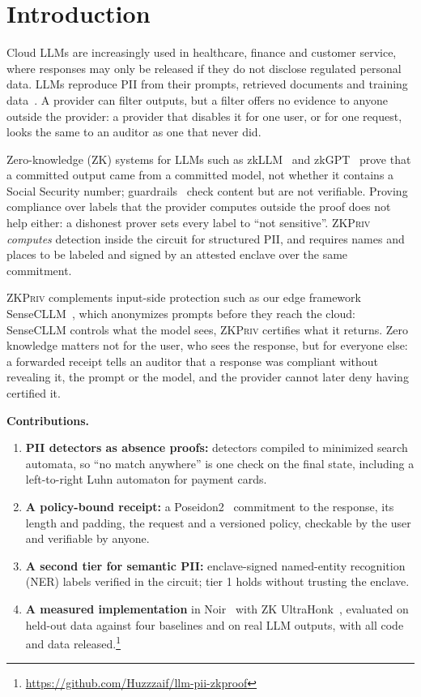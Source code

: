 \documentclass[conference]{IEEEtran}
\newcommand{\sys}{\textsc{ZKPriv}}
\begin{document}
\section{Introduction}

Cloud LLMs are increasingly used in healthcare, finance and customer service, where responses may only be released if they do not disclose regulated personal data. LLMs reproduce PII from their prompts, retrieved documents and training data~\cite{carlini2021extracting}. A provider can filter outputs, but a filter offers no evidence to anyone outside the provider: a provider that disables it for one user, or for one request, looks the same to an auditor as one that never did.

Zero-knowledge (ZK) systems for LLMs such as zkLLM~\cite{sun2024zkllm} and zkGPT~\cite{qu2025zkgpt} prove that a committed output came from a committed model, not whether it contains a Social Security number; guardrails~\cite{nemogauardrails,llamaguard2} check content but are not verifiable. Proving compliance over labels that the provider computes outside the proof does not help either: a dishonest prover sets every label to ``not sensitive''. \sys{} \emph{computes} detection inside the circuit for structured PII, and requires names and places to be labeled and signed by an attested enclave over the same commitment.

\sys{} complements input-side protection such as our edge framework SenseCLLM~\cite{sensecllm}, which anonymizes prompts before they reach the cloud: SenseCLLM controls what the model sees, \sys{} certifies what it returns. Zero knowledge matters not for the user, who sees the response, but for everyone else: a forwarded receipt tells an auditor that a response was compliant without revealing it, the prompt or the model, and the provider cannot later deny having certified it.

\textbf{Contributions.}
\begin{enumerate}[leftmargin=1.2em,itemsep=1pt]
  \item \textbf{PII detectors as absence proofs:} detectors compiled to minimized search automata, so ``no match anywhere'' is one check on the final state, including a left-to-right Luhn automaton for payment cards.
  \item \textbf{A policy-bound receipt:} a Poseidon2~\cite{poseidon2} commitment to the response, its length and padding, the request and a versioned policy, checkable by the user and verifiable by anyone.
  \item \textbf{A second tier for semantic PII:} enclave-signed named-entity recognition (NER) labels verified in the circuit; tier 1 holds without trusting the enclave.
  \item \textbf{A measured implementation} in Noir~\cite{noir} with ZK UltraHonk~\cite{barretenberg}, evaluated on held-out data against four baselines and on real LLM outputs, with all code and data released.\footnote{\url{https://github.com/Huzzzaif/llm-pii-zkproof}}
\end{enumerate}
\end{document}
